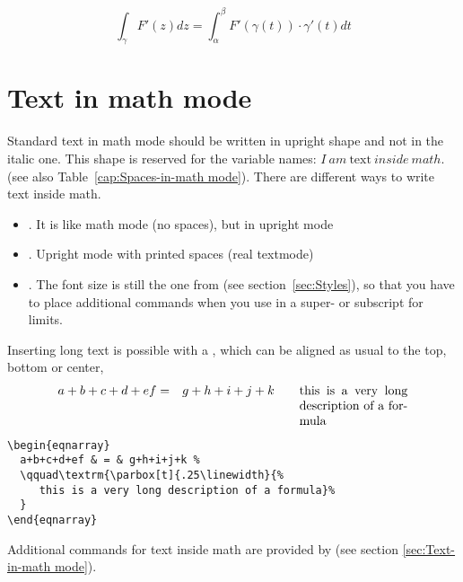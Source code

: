 \begin{LTXexample}[width=0.425\linewidth,wide]
{\delimitershortfall=-1pt
\[
\int_\gamma F'(z) dz =\int_\alpha^\beta
F'\left(\gamma (t)\right)\cdot\gamma '(t)dt
\]}
\end{LTXexample}

\section{Text in math mode}\label{sec:Text}

Standard text in math mode should be written in upright shape and not
in the italic one. This shape is reserved for the variable
names: $\boxed{{I\  am\ \textrm{text}\  inside\  math.}}$ (see also 
Table~\vref{cap:Spaces-in-math mode}). There are different ways to write text inside math.


\begin{itemize}
\item {}. It is like math mode (no spaces), but in upright mode
\item {}. Upright mode with printed spaces (real textmode)
\item {}. The font size is still the one from  
    (see section~\vref{sec:Styles}), so that you have to place additional
commands when you use  in a super- or subscript for limits.
\end{itemize}

Inserting long text is possible with a , which can be aligned as usual to the top,
bottom or center, \eg {}
\begin{eqnarray}
  a+b+c+d+ef & = & g+h+i+j+k %
  \qquad\textrm{\parbox[t]{.25\linewidth}{%
     this is a very long description of a formula}%
  }
\end{eqnarray}

\begin{lstlisting}
\begin{eqnarray}
  a+b+c+d+ef & = & g+h+i+j+k %
  \qquad\textrm{\parbox[t]{.25\linewidth}{%
     this is a very long description of a formula}%
  }
\end{eqnarray}
\end{lstlisting}

Additional commands for text inside math are provided by \AmSmath (see
section \vref{sec:Text-in-math mode}).

